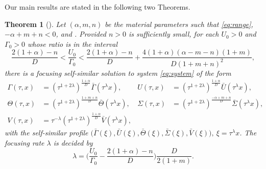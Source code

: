 \documentclass[a4paper,11pt]{article}
\def\bG{{\bar{\Gamma}}}
\def\bV{{\bar{V}}}
\def\bTh{{\bar{\Theta}}}
\def\bS{{\bar{\Sigma}}}
\def\bU{{\bar{U}}}
\newtheorem{theorem}{Theorem}
\theoremstyle{remark}
\begin{document}
Our main results are stated in the following two Theorems.
\begin{theorem}[\cite{KLT17}] \label{mainthm1}
Let $(\alpha, m, n)$ be the material parameters such that \eqref{eq:range}, $-\alpha+m+n<0$,  and . Provided $n>0$ is sufficiently small, for each $U_0>0$ and $\Gamma_0>0$ whose ratio is in the interval
\begin{equation} \label{eq:restriction}
 \frac{2(1+\alpha) -n}{D} < \frac{U _0}{\Gamma _0} < \frac{2(1+\alpha) -n}{D} + \frac{4(1+\alpha)(\alpha-m-n)(1+m)}{D(1+m+n)^2},
\end{equation}
there is a focusing self-similar solution to system \eqref{eq:system} of the form
\begin{align*}
 \Gamma (\tau,x) &= \left(\tau^{1+ 2 \lambda}\right) ^{ \frac{1+ \alpha}{D}} \bG(\tau ^\lambda x), & U (\tau,x) &=\left(\tau^{1+ 2 \lambda}\right) ^{ \frac{1+ \alpha}{D}} \bU( \tau ^\lambda x),\\
 \Theta (\tau,x) &= \left(\tau^{1+ 2 \lambda}\right) ^{ \frac{1+ m +n}{D}} \bTh( \tau ^\lambda x), & \Sigma (\tau,x) &= \left(\tau^{1+ 2 \lambda}\right) ^{ \frac{- \alpha +m+n}{D}} \bS( \tau ^\lambda x),\\
 V (\tau,x) &= \tau ^{-\lambda} \left(\tau^{1+ 2 \lambda}\right) ^{ \frac{1+ \alpha}{D}} \bV( \tau ^\lambda x),
\end{align*}
with the self-similar profile $\big(\bG(\xi), \bU(\xi), \bTh(\xi),\bS(\xi),\bV(\xi)\big), \ \xi = \tau^\lambda x$. The focusing rate $\lambda$ is decided by
\begin{equation} \label{eq:lambda}
 \lambda = \Big(\frac{U _0}{\Gamma _0} - \frac{2(1+\alpha)-n}{D}\Big)\frac{D}{2(1+m)}.
\end{equation}

\end{theorem}
\end{document}
